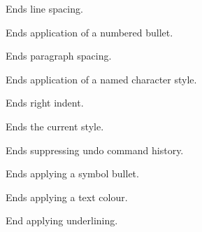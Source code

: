 Ends line spacing.

\label{wxrichtextctrlendnumberedbullet}


Ends application of a numbered bullet.

\label{wxrichtextctrlendparagraphspacing}


Ends paragraph spacing.

\label{wxrichtextctrlendparagraphstyle}


Ends application of a named character style.

\label{wxrichtextctrlendrightindent}


Ends right indent.

\label{wxrichtextctrlendstyle}


Ends the current style.

\label{wxrichtextctrlendsuppressundo}


Ends suppressing undo command history.

\label{wxrichtextctrlendsymbolbullet}


Ends applying a symbol bullet.

\label{wxrichtextctrlendtextcolour}


Ends applying a text colour.

\label{wxrichtextctrlendunderline}


End applying underlining.

\label{wxrichtextctrlextendselection}

